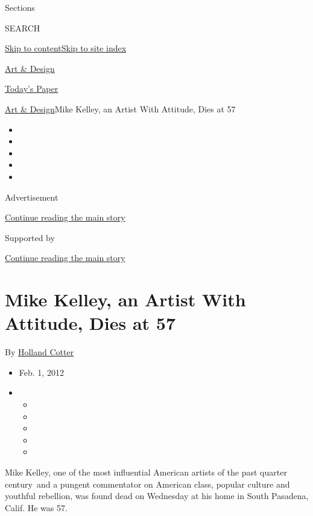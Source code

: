 Sections

SEARCH

\protect\hyperlink{site-content}{Skip to
content}\protect\hyperlink{site-index}{Skip to site index}

\href{https://www.nytimes3xbfgragh.onion/section/arts/design}{Art \&
Design}

\href{https://myaccount.nytimes3xbfgragh.onion/auth/login?response_type=cookie\&client_id=vi}{}

\href{https://www.nytimes3xbfgragh.onion/section/todayspaper}{Today's
Paper}

\href{/section/arts/design}{Art \& Design}\textbar{}Mike Kelley, an
Artist With Attitude, Dies at 57

\begin{itemize}
\item
\item
\item
\item
\item
\end{itemize}

Advertisement

\protect\hyperlink{after-top}{Continue reading the main story}

Supported by

\protect\hyperlink{after-sponsor}{Continue reading the main story}

\hypertarget{mike-kelley-an-artist-with-attitude-dies-at-57}{%
\section{Mike Kelley, an Artist With Attitude, Dies at
57}\label{mike-kelley-an-artist-with-attitude-dies-at-57}}

By \href{https://www.nytimes3xbfgragh.onion/by/holland-cotter}{Holland
Cotter}

\begin{itemize}
\item
  Feb. 1, 2012
\item
  \begin{itemize}
  \item
  \item
  \item
  \item
  \item
  \end{itemize}
\end{itemize}

Mike Kelley, one of the most influential American artists of the past
quarter century~and a pungent commentator on American class, popular
culture and youthful rebellion, was found dead on Wednesday at his home
in South Pasadena, Calif. He was 57.

